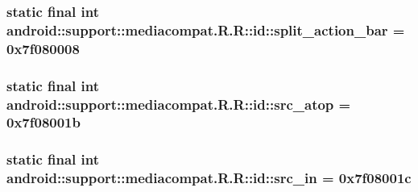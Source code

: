 \hypertarget{classandroid_1_1support_1_1mediacompat_1_1_r_1_1id_e5a7f9562dace7ab2983dce0522e5fe4}{
\subsubsection[{split\_\-action\_\-bar}]{\setlength{\rightskip}{0pt plus 5cm}static final int android::support::mediacompat.R.R::id::split\_\-action\_\-bar = 0x7f080008}}
\label{classandroid_1_1support_1_1mediacompat_1_1_r_1_1id_e5a7f9562dace7ab2983dce0522e5fe4}


\hypertarget{classandroid_1_1support_1_1mediacompat_1_1_r_1_1id_bbc471f575fab0de7d360dc5e1f87c41}{
\subsubsection[{src\_\-atop}]{\setlength{\rightskip}{0pt plus 5cm}static final int android::support::mediacompat.R.R::id::src\_\-atop = 0x7f08001b}}
\label{classandroid_1_1support_1_1mediacompat_1_1_r_1_1id_bbc471f575fab0de7d360dc5e1f87c41}


\hypertarget{classandroid_1_1support_1_1mediacompat_1_1_r_1_1id_19af05c5b40c2dfd3809e6cf8018c1de}{
\subsubsection[{src\_\-in}]{\setlength{\rightskip}{0pt plus 5cm}static final int android::support::mediacompat.R.R::id::src\_\-in = 0x7f08001c}}
\label{classandroid_1_1support_1_1mediacompat_1_1_r_1_1id_19af05c5b40c2dfd3809e6cf8018c1de}


